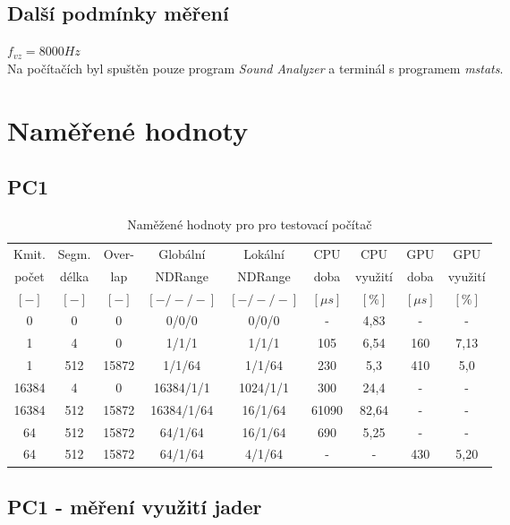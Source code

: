 \subsection{Další podmínky měření}

$f_{vz} = 8000Hz$ \\
Na počítačích byl spuštěn pouze program \emph{Sound Analyzer} a terminál s programem \emph{mstats}.

\section{Naměřené hodnoty}

\subsection{PC1}

\begin{table}[htbp]
\centering
\caption{Naměžené hodnoty pro pro testovací počítač}
\begin{tabular}{|c|c|c|c|c|c|c|c|c|}
\hline
Kmit. & Segm. & Over- & Globální & Lokální & CPU & CPU & GPU & GPU\\
počet & délka & lap & NDRange & NDRange & doba & využití & doba & využití\\
$\left[ - \right]$ & $\left[ - \right]$ & $\left[ - \right]$ &$\left[ -/-/- \right]$ & $\left[ -/-/- \right]$ & $\left[ \mu s\right]$ & $\left[ \% \right]$ & $\left[ \mu s \right]$ & $\left[ \% \right]$\\
\hline
0&0&0&0/0/0&0/0/0&-&4,83&-&-\\
1&4&0&1/1/1&1/1/1&105&6,54&160&7,13\\
1&512&15872&1/1/64&1/1/64&230&5,3&410&5,0\\
16384&4&0&16384/1/1&1024/1/1&300&24,4&-&-\\
16384&512&15872&16384/1/64&16/1/64&61090&82,64&-&-\\
64&512&15872&64/1/64&16/1/64&690&5,25&-&-\\
64&512&15872&64/1/64&4/1/64&-&-&430&5,20\\
\hline
\end{tabular}
\end{table}

\subsection{PC1 - měření využití jader}


